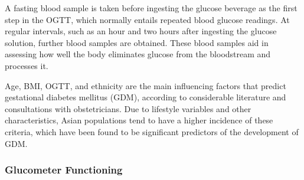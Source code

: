 \documentclass[conference,compsoc]{IEEEtran}
\begin{document}
A fasting blood sample is taken before ingesting the glucose beverage as the first step in the OGTT, which normally entails repeated blood glucose readings. At regular intervals, such as an hour and two hours after ingesting the glucose solution, further blood samples are obtained. These blood samples aid in assessing how well the body eliminates glucose from the bloodstream and processes it.

Age, BMI, OGTT, and ethnicity are the main influencing factors that predict gestational diabetes mellitus (GDM), according to considerable literature and consultations with obstetricians. Due to lifestyle variables and other characteristics, Asian populations tend to have a higher incidence of these criteria, which have been found to be significant predictors of the development of GDM.

\subsubsection{Glucometer Functioning }
\end{document}
